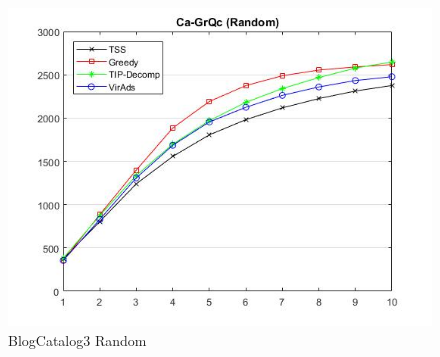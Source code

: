 \begin{figure}
	\centering	
	\includegraphics[scale=0.5]{images/ca-grqcresultrandom.jpg}
	\caption{BlogCatalog3 Random}
\end{figure}

